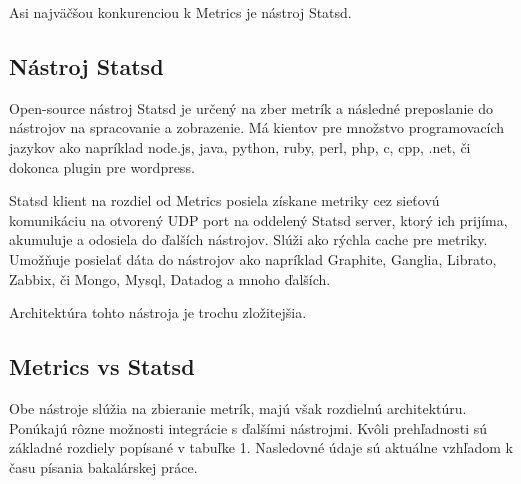 \documentclass[a4paper, usesections, upjsfrontpage, thesismargins, thesislinespacing]{rnthesis}
\begin{document}
Asi najväčšou konkurenciou k Metrics je nástroj Statsd.


\subsection{Nástroj Statsd}

Open-source nástroj Statsd je určený na zber metrík a následné preposlanie do nástrojov na spracovanie a zobrazenie.
Má kientov pre množstvo programovacích jazykov ako napríklad node.js, java, python, ruby, perl, php, c, cpp, .net, či dokonca plugin pre wordpress. 

Statsd klient na rozdiel od Metrics posiela získane metriky cez sieťovú komunikáciu na otvorený UDP port na oddelený Statsd server, ktorý ich prijíma, akumuluje a odosiela do ďalších nástrojov. 
Slúži ako rýchla cache pre metriky. 
Umožňuje posielať dáta do nástrojov ako napríklad Graphite, Ganglia, Librato, Zabbix, či Mongo, Mysql, Datadog a mnoho ďalších.

Architektúra tohto nástroja je trochu zložitejšia.


\subsection{Metrics vs Statsd}

Obe nástroje slúžia na zbieranie metrík, majú však rozdielnú architektúru. 
Ponúkajú rôzne možnosti integrácie s ďalšími nástrojmi. 
Kvôli prehľadnosti sú základné rozdiely popísané v tabuľke 1.
Nasledovné údaje sú aktuálne vzhľadom k času písania bakalárskej práce.
\end{document}
